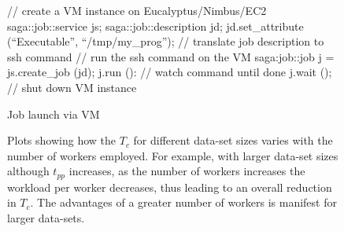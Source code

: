 \documentclass[conference,final]{IEEEtran}
\newcommand{\tc }{ $T_c$ }
\newcommand{\upp}{\vspace*{-0.5em}}
\begin{document}
\begin{figure}[!ht]
\upp
 \begin{center}
  \begin{mycode}[label=SAGA create a VM instance on a Cloud]
   {// create a VM instance on Eucalyptus/Nimbus/EC2
    saga::job::service     js;
    saga::job::description jd;
    jd.set_attribute (``Executable'', ``/tmp/my_prog'');
    // translate job description to ssh command
    // run the ssh command on the VM
    saga:job::job j = js.create_job (jd);
    j.run ():
    // watch command until done
    j.wait ();
   } // shut down VM instance
  \end{mycode}
  \caption{\label{vmjob} Job launch via VM}
 \end{center}
\upp
\end{figure}

\begin{figure}[t]
  \caption{Plots showing how the \tc for different data-set sizes
    varies with the number of workers employed.  For example, with
    larger data-set sizes although $t_{pp}$ increases, as the number
    of workers increases the workload per worker decreases, thus
    leading to an overall reduction in $T_c$. The advantages of a
    greater number of workers is manifest for larger data-sets.}
\label{grids1}
\end{figure}
\end{document}
